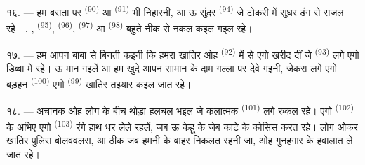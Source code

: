 १६. --- हम बसता पर  \textsuperscript{(90)} आ  \textsuperscript{(91)} भी निहारनी, आ ऊ सुंदर 
\textsuperscript{(94)} जे टोकरी में सुघर ढंग से सजल रहे। ,
,  \textsuperscript{(95)},
 \textsuperscript{(96)},  \textsuperscript{(97)}
आ  \textsuperscript{(98)} बहुते नीक से नकल कइल गइल
रहे।

\VUsaut{4.4mm}
\VUsaut{2.8mm}

१७. --- हम आपन बाबा से बिनती कइनी कि हमरा खातिर ओह  \textsuperscript{(92)} में से एगो खरीद दीं जे 
\textsuperscript{(93)} लगे एगो डिब्बा में रहे। ऊ मान गइलें आ हम खुदे आपन
सामान के दाम गल्ला पर देवे गइनी, जेकरा लगे एगो बड़हन 
\textsuperscript{(100)} एगो  \textsuperscript{(99)} खातिर
तइयार कइल जात रहे।

१८. --- अचानक ओह लोग के बीच थोड़ा हलचल भइल जे कलात्मक  \textsuperscript{(101)} लगे रुकल रहे। एगो 
\textsuperscript{(102)} के अभिए एगो  \textsuperscript{(103)}
रंगे हाथ धर लेले रहलें, जब ऊ केहू के जेब काटे के कोसिस करत रहे। लोग
ओकर  खातिर पुलिस बोलववलस, आ ठीक जब हमनी के बाहर
निकलत रहनी जा, ओह गुनहगार के हवालात ले जात रहे।
